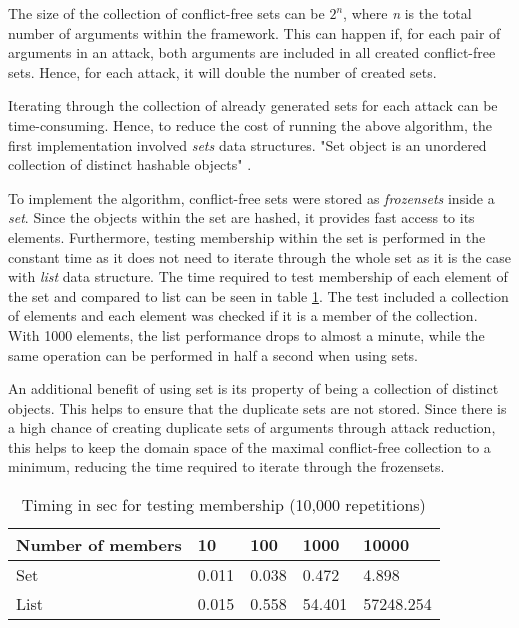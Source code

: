 The size of the collection of conflict-free sets can be $2^n$, where \textit{n} is the total number of arguments within the framework. This can happen if, for each pair of arguments in an attack, both arguments are included in all created conflict-free sets. Hence, for each attack, it will double the number of created sets. 

Iterating through the collection of already generated sets for each attack can be time-consuming. Hence, to reduce the cost of running the above algorithm, the first implementation involved \textit{sets} data structures. "Set object is an unordered collection of distinct hashable objects" \citep{python_sets}.

To implement the algorithm, conflict-free sets were stored as \textit{frozensets} inside a \textit{set}. Since the objects within the set are hashed, it provides fast access to its elements. Furthermore, testing membership within the set is performed in the constant time as it does not need to iterate through the whole set as it is the case with \textit{list} data structure. The time required to test membership of each element of the set and compared to list can be seen in table \ref{table:timingsMembership}. The test included a collection of elements and each element was checked if it is a member of the collection. With 1000 elements, the list performance drops to almost a minute, while the same operation can be performed in half a second when using sets. 

An additional benefit of using set is its property of being a collection of distinct objects. This helps to ensure that the duplicate sets are not stored. Since there is a high chance of creating duplicate sets of arguments through attack reduction, this helps to keep the domain space of the maximal conflict-free collection to a minimum, reducing the time required to iterate through the frozensets.

\begin{table}[h]
	\centering
	\caption{Timing in sec for testing membership (10,000 repetitions)}
	\label{table:timingsMembership}
	\begin{tabular}{lllll}
		\hline
		Number of members & 10    & 100   & 1000   & 10000 \\ \hline
		Set                & 0.011 & 0.038 & 0.472  & 4.898 \\
		List               & 0.015 & 0.558 & 54.401 & 57248.254 \\     
	\end{tabular}
\end{table}

